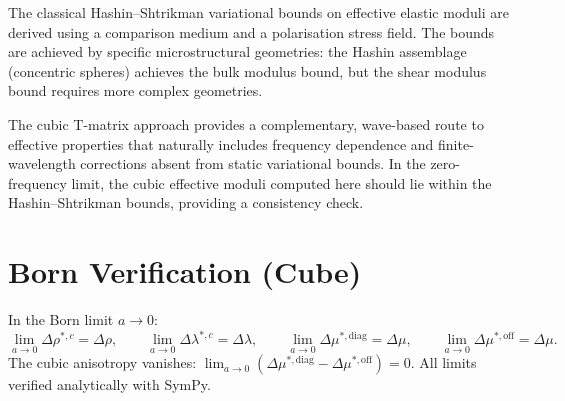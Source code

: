 The classical Hashin--Shtrikman variational
bounds \citep{HashinShtrikman1962a,HashinShtrikman1962b,HashinShtrikman1963}
on effective elastic moduli are derived using a comparison medium and a
polarisation stress field.  The bounds are achieved by specific
microstructural geometries: the Hashin assemblage (concentric spheres)
achieves the bulk modulus bound, but the shear modulus bound requires more
complex geometries.

The cubic T-matrix approach provides a complementary, wave-based route to
effective properties that naturally includes frequency dependence and
finite-wavelength corrections absent from static variational bounds.  In
the zero-frequency limit, the cubic effective moduli computed here should
lie within the Hashin--Shtrikman bounds, providing a consistency check.


\section{Born Verification (Cube)}

In the Born limit $a\to 0$:
\begin{equation}
  \lim_{a\to 0}\Delta\rho^{*,c} = \Delta\rho, \qquad
  \lim_{a\to 0}\Delta\lambda^{*,c} = \Delta\lambda, \qquad
  \lim_{a\to 0}\Delta\mu^{*,\text{diag}} = \Delta\mu, \qquad
  \lim_{a\to 0}\Delta\mu^{*,\text{off}} = \Delta\mu.
\label{eq:Bornlim_cube}
\end{equation}
The cubic anisotropy vanishes:
$\lim_{a\to 0}(\Delta\mu^{*,\text{diag}} - \Delta\mu^{*,\text{off}}) = 0$.
All limits verified analytically with SymPy.
